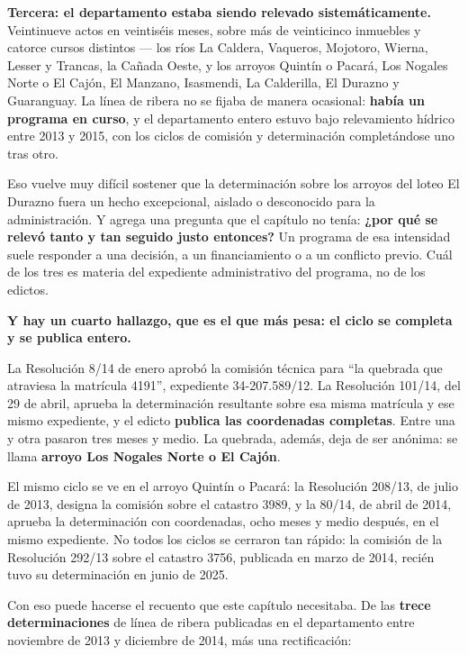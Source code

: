 \textbf{Tercera: el departamento estaba siendo relevado sistemáticamente.} Veintinueve actos en veintiséis meses, sobre más de veinticinco inmuebles y catorce cursos distintos --- los ríos La Caldera, Vaqueros, Mojotoro, Wierna, Lesser y Trancas, la Cañada Oeste, y los arroyos Quintín o Pacará, Los Nogales Norte o El Cajón, El Manzano, Isasmendi, La Calderilla, El Durazno y Guaranguay. La línea de ribera no se fijaba de manera ocasional: \textbf{había un programa en curso}, y el departamento entero estuvo bajo relevamiento hídrico entre 2013 y 2015, con los ciclos de comisión y determinación completándose uno tras otro.

Eso vuelve muy difícil sostener que la determinación sobre los arroyos del loteo El Durazno fuera un hecho excepcional, aislado o desconocido para la administración. Y agrega una pregunta que el capítulo no tenía: \textbf{¿por qué se relevó tanto y tan seguido justo entonces?} Un programa de esa intensidad suele responder a una decisión, a un financiamiento o a un conflicto previo. Cuál de los tres es materia del expediente administrativo del programa, no de los edictos.

\begin{cautela}
\textbf{Y hay un cuarto hallazgo, que es el que más pesa: el ciclo se completa y se publica entero.}

La Resolución 8/14 de enero aprobó la comisión técnica para ``la quebrada que atraviesa la matrícula 4191'', expediente 34-207.589/12. La Resolución 101/14, del 29 de abril, aprueba la determinación resultante sobre esa misma matrícula y ese mismo expediente, y el edicto \textbf{publica las coordenadas completas}. Entre una y otra pasaron tres meses y medio. La quebrada, además, deja de ser anónima: se llama \textbf{arroyo Los Nogales Norte o El Cajón}.

El mismo ciclo se ve en el arroyo Quintín o Pacará: la Resolución 208/13, de julio de 2013, designa la comisión sobre el catastro 3989, y la 80/14, de abril de 2014, aprueba la determinación con coordenadas, ocho meses y medio después, en el mismo expediente. No todos los ciclos se cerraron tan rápido: la comisión de la Resolución 292/13 sobre el catastro 3756, publicada en marzo de 2014, recién tuvo su determinación en junio de 2025.

Con eso puede hacerse el recuento que este capítulo necesitaba. De las \textbf{trece determinaciones} de línea de ribera publicadas en el departamento entre noviembre de 2013 y diciembre de 2014, más una rectificación:
\end{cautela}

